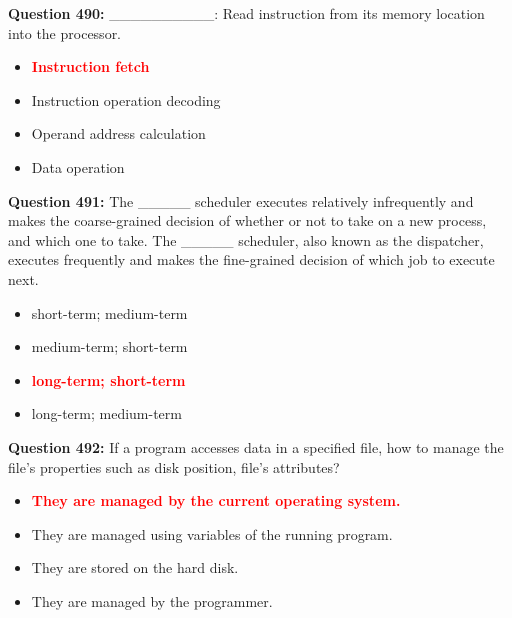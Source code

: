 \documentclass[12pt,a4paper]{article}
\begin{document}
\vspace{0.5cm}

\textbf{Question 490:} __________: Read instruction from its memory location into the processor.

\begin{itemize}
    \item[\textbf{A.}] \textcolor{red}{\textbf{Instruction fetch}}
    \item[\textbf{B.}] Instruction operation decoding
    \item[\textbf{C.}] Operand address calculation
    \item[\textbf{D.}] Data operation
\end{itemize}

\vspace{0.5cm}

\textbf{Question 491:} The _____ scheduler executes relatively infrequently and makes the coarse-grained decision of whether or not to take on a new process, and which one to take. The _____ scheduler, also known as the dispatcher, executes frequently and makes the fine-grained decision of which job to execute next.

\begin{itemize}
    \item[\textbf{A.}] short-term; medium-term
    \item[\textbf{B.}] medium-term; short-term
    \item[\textbf{C.}] \textcolor{red}{\textbf{long-term; short-term}}
    \item[\textbf{D.}] long-term; medium-term
\end{itemize}

\vspace{0.5cm}

\textbf{Question 492:} If a program accesses data in a specified file, how to manage the file's properties such as disk position, file's attributes?

\begin{itemize}
    \item[\textbf{A.}] \textcolor{red}{\textbf{They are managed by the current operating system.}}
    \item[\textbf{B.}] They are managed using variables of the running program.
    \item[\textbf{C.}] They are stored on the hard disk.
    \item[\textbf{D.}] They are managed by the programmer.
\end{itemize}
\end{document}
